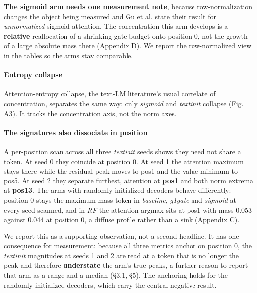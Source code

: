 \documentclass{article}
\begin{document}
\textbf{The sigmoid arm needs one measurement note}, because row-normalization changes the object being measured and Gu et al. \cite{ref6} state their result for \textit{unnormalized} sigmoid attention. The concentration this arm develops is a \textbf{relative} reallocation of a shrinking gate budget onto position 0, not the growth of a large absolute mass there (Appendix D). We report the row-normalized view in the tables so the arms stay comparable.

\paragraph{Entropy collapse} Attention-entropy collapse, the text-LM literature's usual correlate of concentration, separates the same way: only \textit{sigmoid} and \textit{textinit} collapse (Fig. A3). It tracks the concentration axis, not the norm axes.

\paragraph{The signatures also dissociate in position} A per-position scan across all three \textit{textinit} seeds shows they need not share a token. At seed 0 they coincide at position 0. At seed 1 the attention maximum stays there while the residual peak moves to pos1 and the value minimum to pos5. At seed 2 they separate furthest, attention at \textbf{pos1} and both norm extrema at \textbf{pos13}. The arms with randomly initialized decoders behave differently: position 0 stays the maximum-mass token in \textit{baseline}, \textit{g1gate} and \textit{sigmoid} at every seed scanned, and in \textit{RF} the attention argmax sits at pos1 with mass 0.053 against 0.044 at position 0, a diffuse profile rather than a sink (Appendix C).

We report this as a supporting observation, not a second headline. It has one consequence for measurement: because all three metrics anchor on position 0, the \textit{textinit} magnitudes at seeds 1 and 2 are read at a token that is no longer the peak and therefore \textbf{understate} the arm's true peaks, a further reason to report that arm as a range and a median (\S3.1, \S5). The anchoring holds for the randomly initialized decoders, which carry the central negative result.


\newpage

\end{document}
